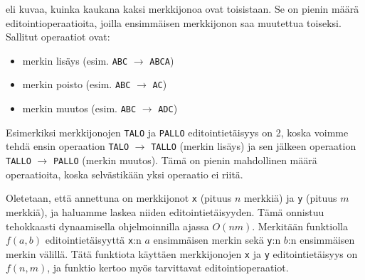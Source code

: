  eli
kuvaa, kuinka kaukana kaksi merkkijonoa ovat toisistaan.
Se on pienin määrä editointioperaatioita,
joilla ensimmäisen merkkijonon saa muutettua toiseksi.
Sallitut operaatiot ovat:
\begin{itemize}
\item merkin lisäys (esim. \texttt{ABC} $\rightarrow$ \texttt{ABCA})
\item merkin poisto (esim. \texttt{ABC} $\rightarrow$ \texttt{AC})
\item merkin muutos (esim. \texttt{ABC} $\rightarrow$ \texttt{ADC})
\end{itemize}

Esimerkiksi merkkijonojen \texttt{TALO} ja \texttt{PALLO}
editointietäisyys on 2, koska voimme tehdä ensin
operaation \texttt{TALO} $\rightarrow$ \texttt{TALLO}
(merkin lisäys) ja sen jälkeen operaation
\texttt{TALLO} $\rightarrow$ \texttt{PALLO}
(merkin muutos).
Tämä on pienin mahdollinen määrä operaatioita, koska
selvästikään yksi operaatio ei riitä.

Oletetaan, että annettuna on merkkijonot
\texttt{x} (pituus $n$ merkkiä) ja
\texttt{y} (pituus $m$ merkkiä),
ja haluamme laskea niiden editointietäisyyden.
Tämä onnistuu tehokkaasti dynaamisella
ohjelmoinnilla ajassa $O(nm)$.
Merkitään funktiolla $f(a,b)$
editointietäisyyttä \texttt{x}:n $a$
ensimmäisen merkin sekä
\texttt{y}:n $b$:n ensimmäisen merkin välillä.
Tätä funktiota käyttäen
merkkijonojen
\texttt{x} ja \texttt{y} editointietäisyys
on $f(n,m)$, ja funktio kertoo myös tarvittavat
editointioperaatiot.

